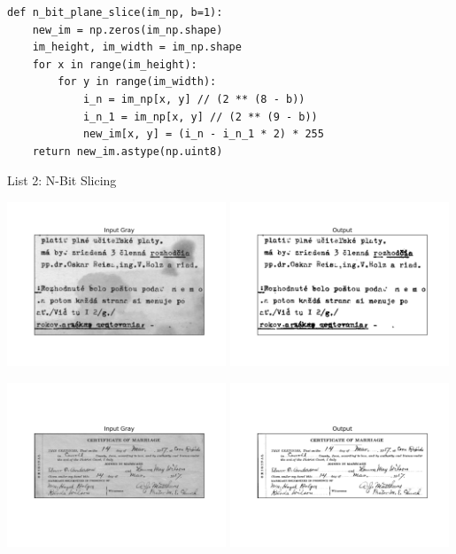 \documentclass[titlepage]{article}
\begin{document}
\begin{listing}
\begin{verbatim}
def n_bit_plane_slice(im_np, b=1):
    new_im = np.zeros(im_np.shape)
    im_height, im_width = im_np.shape
    for x in range(im_height):
        for y in range(im_width):
            i_n = im_np[x, y] // (2 ** (8 - b))
            i_n_1 = im_np[x, y] // (2 ** (9 - b))
            new_im[x, y] = (i_n - i_n_1 * 2) * 255
    return new_im.astype(np.uint8)
\end{verbatim}
\centering
\caption{List 2: N-Bit Slicing}
\newline
\end{listing}

\begin{center}
\includegraphics[width=0.49\textwidth]{img_1_gray.png}
\includegraphics[width=0.49\textwidth]{img_1_output.png}
\end{center}

\begin{center}
\includegraphics[width=0.49\textwidth]{img_2_gray.png}
\includegraphics[width=0.49\textwidth]{img_2_output.png}
\end{center}
\end{document}
